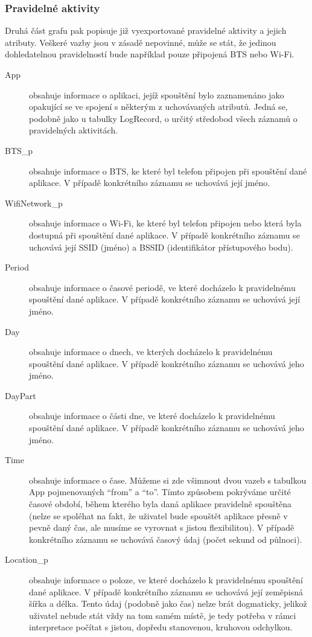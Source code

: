 \documentclass[thesis=M,czech]{FITthesis}[2012/06/26]
\begin{document}
\subsubsection*{Pravidelné aktivity}
Druhá část grafu pak popisuje již vyexportované pravidelné aktivity a jejich atributy. Veškeré vazby jsou v zásadě nepovinné, může se stát, že jedinou dohledatelnou pravidelností bude například pouze připojená BTS nebo Wi-Fi.

\begin{description}
\item[App]
obsahuje informace o aplikaci, jejíž spouštění bylo zaznamenáno jako opakující se ve spojení s některým z uchovávaných atributů. Jedná se, podobně jako u tabulky LogRecord, o určitý středobod všech záznamů o pravidelných aktivitách.

\item[BTS\_p]
obsahuje informace o BTS, ke které byl telefon připojen při spouštění dané aplikace. V případě konkrétního záznamu se uchovává její jméno.

\item[WifiNetwork\_p]
obsahuje informace o Wi-Fi, ke které byl telefon připojen nebo která byla dostupná při spouštění dané aplikace. V případě konkrétního záznamu se uchovává její SSID (jméno) a BSSID (identifikátor přístupového bodu).

\item[Period]
obsahuje informace o časové periodě, ve které docházelo k pravidelnému spouštění dané aplikace. V případě konkrétního záznamu se uchovává její jméno.

\item[Day]
obsahuje informace o dnech, ve kterých docházelo k pravidelnému spouštění dané aplikace. V případě konkrétního záznamu se uchovává jeho jméno.

\item[DayPart]
obsahuje informace o části dne, ve které docházelo k pravidelnému spouštění dané aplikace. V případě konkrétního záznamu se uchovává jeho jméno.

\item[Time]
obsahuje informace o čase. Můžeme si zde všimnout dvou vazeb s tabulkou App pojmenovaných “from” a “to”. Tímto způsobem pokrýváme určité časové období, během kterého byla daná aplikace pravidelně spouštěna (nelze se spoléhat na fakt, že uživatel bude spouštět aplikace přesně v pevně daný čas, ale musíme se vyrovnat s jistou flexibilitou). V případě konkrétního záznamu se uchovává časový údaj (počet sekund od půlnoci).

\item[Location\_p]
obsahuje informace o poloze, ve které docházelo k pravidelnému spouštění dané aplikace. V případě konkrétního záznamu se uchovává její zeměpisná šířka a délka. Tento údaj (podobně jako čas) nelze brát dogmaticky, jelikož uživatel nebude stát vždy na tom samém místě, je tedy potřeba v rámci interpretace počítat s jistou, dopředu stanovenou, kruhovou odchylkou.
\end{description}
\end{document}
